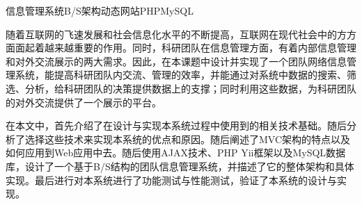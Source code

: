 \begin{Cabstract}{信息管理系统}{B/S架构}{动态网站}{PHP}{MySQL}

随着互联网的飞速发展和社会信息化水平的不断提高，互联网在现代社会中的方方面面起着越来越重要的作用。同时，科研团队在信息管理方面，有着内部信息管理和对外交流展示的两大需求。因此，在本课题中设计并实现了一个团队网络信息管理系统，能提高科研团队内交流、管理的效率，并能通过对系统中数据的搜索、筛选、分析，给科研团队的决策提供数据上的支撑；同时利用这些数据，为科研团队的对外交流提供了一个展示的平台。

在本文中，首先介绍了在设计与实现本系统过程中使用到的相关技术基础。随后分析了选择这些技术来实现本系统的优点和原因。随后阐述了MVC架构的特点以及如何应用到Web应用中去。随后使用AJAX技术、PHP Yii框架以及MySQL数据库，设计了一个基于B/S结构的团队信息管理系统，并描述了它的整体架构和具体实现。最后进行对本系统进行了功能测试与性能测试，验证了本系统的设计与实现。
\end{Cabstract}